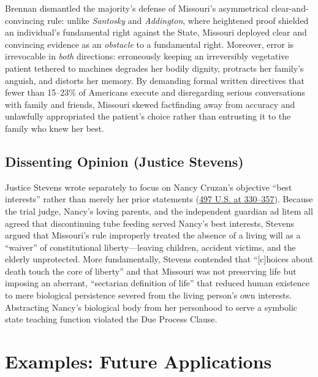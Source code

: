 \documentclass[12pt]{article}
\begin{document}
Brennan dismantled the majority's defense of Missouri's asymmetrical clear-and-convincing rule: unlike \textit{Santosky} and \textit{Addington}, where heightened proof shielded an individual's fundamental right against the State, Missouri deployed clear and convincing evidence as an \textit{obstacle} to a fundamental right. Moreover, error is irrevocable in \textit{both} directions: erroneously keeping an irreversibly vegetative patient tethered to machines degrades her bodily dignity, protracts her family's anguish, and distorts her memory. By demanding formal written directives that fewer than 15--23\% of Americans execute and disregarding serious conversations with family and friends, Missouri skewed factfinding away from accuracy and unlawfully appropriated the patient's choice rather than entrusting it to the family who knew her best.

\subsection{Dissenting Opinion (Justice Stevens)}

Justice Stevens wrote separately to focus on Nancy Cruzan's objective ``best interests'' rather than merely her prior statements (\href{https://supreme.justia.com/cases/federal/us/497/261/}{497 U.S. at 330--357}). Because the trial judge, Nancy's loving parents, and the independent guardian ad litem all agreed that discontinuing tube feeding served Nancy's best interests, Stevens argued that Missouri's rule improperly treated the absence of a living will as a ``waiver'' of constitutional liberty---leaving children, accident victims, and the elderly unprotected. More fundamentally, Stevens contended that ``[c]hoices about death touch the core of liberty'' and that Missouri was not preserving life but imposing an aberrant, ``sectarian definition of life'' that reduced human existence to mere biological persistence severed from the living person's own interests. Abstracting Nancy's biological body from her personhood to serve a symbolic state teaching function violated the Due Process Clause.

\section{Examples: Future Applications}
\end{document}

